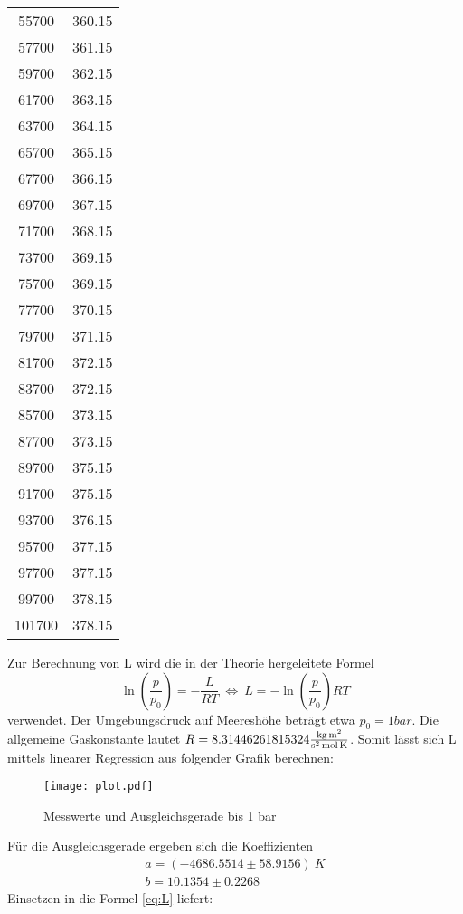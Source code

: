 \begin{table}[H]
\begin{tabular}{c c}
      55700 &   360.15 \\ 
      57700 &   361.15 \\ 
      59700 &   362.15 \\ 
      61700 &   363.15 \\ 
      63700 &   364.15 \\ 
      65700 &   365.15 \\ 
      67700 &   366.15 \\ 
      69700 &   367.15 \\ 
      71700 &   368.15 \\ 
      73700 &   369.15 \\ 
      75700 &   369.15 \\ 
      77700 &   370.15 \\ 
      79700 &   371.15 \\ 
      81700 &   372.15 \\ 
      83700 &   372.15 \\ 
      85700 &   373.15 \\ 
      87700 &   373.15 \\
      89700 &   375.15 \\ 
      91700 &   375.15 \\ 
      93700 &   376.15 \\ 
      95700 &   377.15 \\ 
      97700 &   377.15 \\ 
      99700 &   378.15 \\ 
      101700 &   378.15 \\ 
    \bottomrule
    \end{tabular}
  \end{table}

  \noindent Zur Berechnung von L wird die in der Theorie hergeleitete Formel 
  \begin{equation}
    \label{eq:L}
    \ln{(\dfrac{p}{p_0})}=-\dfrac{L}{RT}\ \Leftrightarrow \ L=-\ln{(\dfrac{p}{p_0})}RT
  \end{equation} 
  verwendet. Der Umgebungsdruck auf Meereshöhe beträgt etwa
  $p_0=1 bar$. Die allgemeine Gaskonstante lautet $R=8.31446261815324
  {\displaystyle \textstyle {\frac {\mathrm {kg\,m^{2}} }{\mathrm {s^{2}\,mol\,K} }}} $. Somit lässt 
  sich L mittels linearer Regression aus folgender Grafik berechnen: 
  \begin{figure}[H]
   \centering
   \texttt{[image: plot.pdf]}
   \caption{Messwerte und Ausgleichsgerade bis 1 bar}
   \label{fig:plot}
  \end{figure}
  \noindent Für die Ausgleichsgerade ergeben sich die Koeffizienten
  \begin{align*}
   a=(-4686.5514 \pm 58.9156)\ K\\
   b=10.1354 \pm 0.2268
  \end{align*}
  \noindent Einsetzen in die Formel \eqref{eq:L} liefert:

